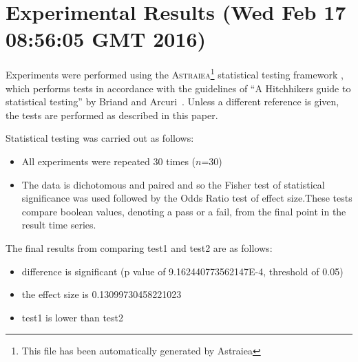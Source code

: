 \documentclass[]{article}
\begin{document}
\section{Experimental Results (Wed Feb 17 08:56:05 GMT 2016)}
Experiments were performed using the \textsc{Astraiea}\footnote{This file has been automatically generated by Astraiea} statistical testing framework \cite{Neumann:2014:EET:2598394.2609850},
which performs tests in accordance with the guidelines of ``A Hitchhikers guide to statistical testing''
by Briand and Arcuri~\cite{Arcuri2012}.
Unless a different reference is given, the tests are performed as described in this paper.



Statistical testing was carried out as follows: 
\begin{itemize}
\item{All experiments were repeated 30 times ($n$=30)}
\item{The data is dichotomous and paired and so the Fisher test of statistical significance was used followed by the Odds Ratio test of effect size.These tests compare boolean values, denoting a pass or a fail, from the final point in the result time series. }
\end{itemize}
The final results from comparing test1 and test2 are as follows:
\begin{itemize}
\item{difference is significant (p value of 9.162440773562147E-4, threshold of 0.05)}
\item{the effect size is 0.13099730458221023}
\item{test1 is lower than test2}
\end{itemize}
\end{document}
